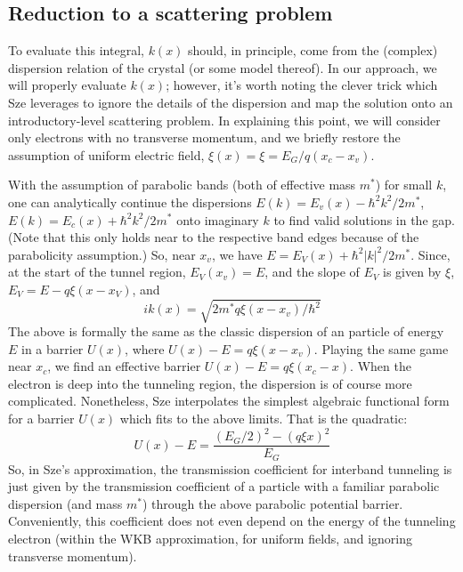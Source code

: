 \subsection{Reduction to a scattering problem}
To evaluate this integral, $k(x)$ should, in principle, come from the (complex) dispersion relation of the crystal (or some model thereof).  In our approach, we will properly evaluate $k(x)$; however, it's worth noting the clever trick which Sze leverages to ignore the details of the dispersion and map the solution onto an introductory-level scattering problem.  In explaining this point, we will consider only electrons with no transverse momentum, and we briefly restore the assumption of uniform electric field, $\xi(x)=\xi=E_G/q(x_c-x_v)$.

With the assumption of parabolic bands (both of effective mass $m^*$) for small $k$, one can  analytically continue the dispersions $E(k)=E_v(x)-\hbar^2k^2/2m^*$, $E(k)=E_c(x)+\hbar^2k^2/2m^*$ onto imaginary $k$ to find valid solutions in the gap.  (Note that this only holds near to the respective band edges because of the parabolicity assumption.)  So, near $x_v$, we have $E=E_V(x)+\hbar^2|k|^2/2m^*$.  Since, at the start of the tunnel region, $E_V(x_v)=E$, and the slope of $E_V$ is given by $\xi$, $E_V=E-q\xi(x-x_V)$, and
$$ik(x)=\sqrt{2m^*q\xi(x-x_v)/\hbar^2}$$
The above is formally the same as the classic dispersion of an particle of energy $E$ in a barrier $U(x)$, where $U(x)-E=q\xi(x-x_v)$.  Playing the same game near $x_c$, we find an effective barrier $U(x)-E=q\xi(x_c-x)$.  When the electron is deep into the tunneling region, the dispersion is of course more complicated.  Nonetheless, Sze interpolates the simplest algebraic functional form for a barrier $U(x)$ which fits to the above limits.  That is the quadratic:
$$U(x)-E=\frac{(E_G/2)^2-(q\xi x)^2}{E_G}$$
So, in Sze's approximation, the transmission coefficient for interband tunneling is just given by the transmission coefficient of a particle with a familiar parabolic dispersion (and mass $m^*$) through the above parabolic potential barrier.  Conveniently, this coefficient does not even depend on the energy of the tunneling electron (within the WKB approximation, for uniform fields, and ignoring transverse momentum).

